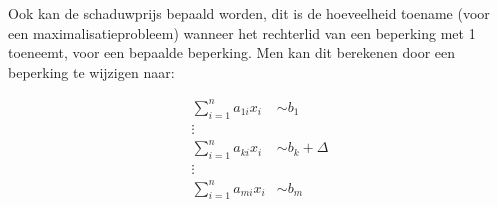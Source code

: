 Ook kan de schaduwprijs bepaald worden, dit is de hoeveelheid toename (voor een maximalisatieprobleem) wanneer het rechterlid van een beperking met 1 toeneemt, voor een bepaalde beperking. Men kan dit berekenen door een beperking te wijzigen naar:

\begin{align*} 
    \sum_{i=1}^{n}{a_{1i}x_i} & \sim  b_1 \\ 
    \vdots \\
    \sum_{i=1}^{n}{a_{ki}x_i} & \sim  b_k + \Delta \\ 
    \vdots \\
    \sum_{i=1}^{n}{a_{mi}x_i} & \sim  b_m
\end{align*}
